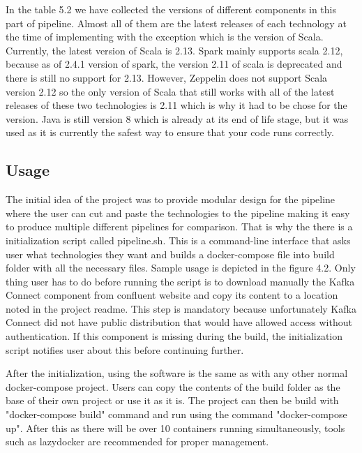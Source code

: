In the table 5.2 we have collected the versions of different components in this part of pipeline.
Almost all of them are the latest releases of each technology at the time of implementing with the exception which is the version of Scala.
Currently, the latest version of Scala is 2.13.
Spark mainly supports scala 2.12, because as of 2.4.1 version of spark, the version 2.11 of scala is deprecated and there is still no support for 2.13.
However, Zeppelin does not support Scala version 2.12 so the only version of Scala that still works with all of the latest releases of these two technologies is 2.11 which is why it had to be chose for the version.
Java is still version 8 which is already at its end of life stage, but it was used as it is currently the safest way to ensure that your code runs correctly.

\subsection{Usage}

The initial idea of the project was to provide modular design for the pipeline where the user can cut and paste the technologies to the pipeline making it easy to produce multiple different pipelines for comparison.
That is why the there is a initialization script called pipeline.sh.
This is a command-line interface that asks user what technologies they want and builds a docker-compose file into build folder with all the necessary files.
Sample usage is depicted in the figure 4.2.
Only thing user has to do before running the script is to download manually the Kafka Connect component from confluent website and copy its content to a location noted in the project readme. 
This step is mandatory because unfortunately Kafka Connect did not have public distribution that would have allowed access without authentication.
If this component is missing during the build, the initialization script notifies user about this before continuing further.

After the initialization, using the software is the same as with any other normal docker-compose project.
Users can copy the contents of the build folder as the base of their own project or use it as it is.
The project can then be build with "docker-compose build" command and run using the command "docker-compose up".
After this as there will be over 10 containers running simultaneously, tools such as lazydocker are recommended for proper management.

